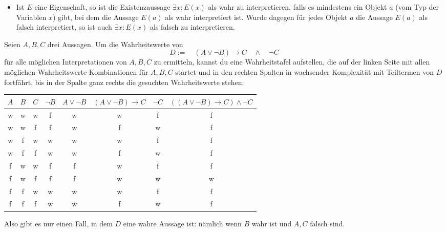 \begin{defin}[Interpretation]
\begin{itemize}
        \item Ist $E$ eine Eigenschaft, so ist die Existenzaussage $\exists x: E(x)$ als wahr zu interpretieren, falls es mindestens ein Objekt $a$ (vom Typ der Variablen $x$) gibt, bei dem die Aussage $E(a)$ als wahr interpretiert ist. Wurde dagegen für jedes Objekt $a$ die Aussage $E(a)$ als falsch interpretiert, so ist auch $\exists x: E(x)$ als falsch zu interpretieren.
    \end{itemize}
\end{defin}


\begin{bsp}
    Seien $A,B,C$ drei Aussagen. Um die Wahrheitswerte von
        \[ D:= \quad (A\lor \neg B) \to C\quad \land\quad \neg C\]
    für alle möglichen Interpretationen von $A,B,C$ zu ermitteln, kannst du eine Wahrheitstafel aufstellen, die auf der linken Seite mit allen möglichen Wahrheitswerte-Kombinationen für $A,B,C$ startet und in den rechten Spalten in wachsender Komplexität mit Teiltermen von $D$ fortfährt, bis in der Spalte ganz rechts die gesuchten Wahrheitswerte stehen:
    \begin{center}
    \begin{tabular}{ccc|ccccc}
        $A$ & $B$ & $C$ & $\neg B$ & $A\lor \neg B$ & $(A\lor \neg B)\to C$ & $\neg C$ & $((A\lor \neg B) \to C)\land \neg C$ \\
        \hline
        w & w & w &  f & w & w & f & f \\
        w & w & f &  f & w & f & w & f \\
        w & f & w &  w & w & w & f & f \\
        w & f & f &  w & w & f & w & f \\
        f & w & w &  f & f & w & f & f \\
        f & w & f &  f & f & w & w & w \\
        f & f & w &  w & w & w & f & f \\
        f & f & f &  w & w & f & w & f
    \end{tabular}
    \end{center}
    Also gibt es nur einen Fall, in dem $D$ eine wahre Aussage ist: nämlich wenn $B$ wahr ist und $A,C$ falsch sind.
\end{bsp}


